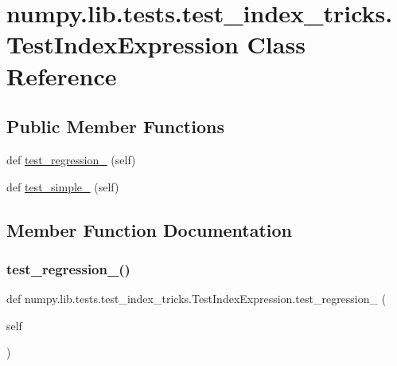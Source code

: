 \hypertarget{classnumpy_1_1lib_1_1tests_1_1test__index__tricks_1_1TestIndexExpression}{}\section{numpy.\+lib.\+tests.\+test\+\_\+index\+\_\+tricks.\+Test\+Index\+Expression Class Reference}
\label{classnumpy_1_1lib_1_1tests_1_1test__index__tricks_1_1TestIndexExpression}
\subsection*{Public Member Functions}
\begin{DoxyCompactItemize}
\item 
def \hyperlink{classnumpy_1_1lib_1_1tests_1_1test__index__tricks_1_1TestIndexExpression_a70505f84a3aaad0fabc9d697c08c5b17}{test\+\_\+regression\+\_} (self)
\item 
def \hyperlink{classnumpy_1_1lib_1_1tests_1_1test__index__tricks_1_1TestIndexExpression_a1fa4ea9f76d940d2d40dd7d480c087b6}{test\+\_\+simple\+\_} (self)
\end{DoxyCompactItemize}


\subsection{Member Function Documentation}
\mbox{\label{classnumpy_1_1lib_1_1tests_1_1test__index__tricks_1_1TestIndexExpression_a70505f84a3aaad0fabc9d697c08c5b17}} 
\subsubsection{\texorpdfstring{test\+\_\+regression\+\_()}{test\_regression\_1()}}
{\footnotesize\ttfamily def numpy.\+lib.\+tests.\+test\+\_\+index\+\_\+tricks.\+Test\+Index\+Expression.\+test\+\_\+regression\+\_ (\begin{DoxyParamCaption}\item[{}]{self }\end{DoxyParamCaption})}

